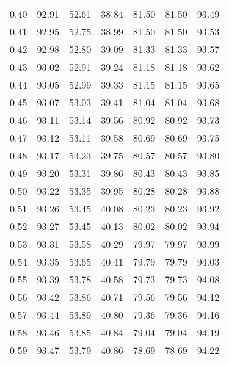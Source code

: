 \begin{tabular}{|c|c|c|c|c|c|c|}
      0.40 &     92.91 &     52.61 &      38.84 &   81.50 &      81.50 &         93.49 \\
      0.41 &     92.95 &     52.75 &      38.99 &   81.50 &      81.50 &         93.53 \\
      0.42 &     92.98 &     52.80 &      39.09 &   81.33 &      81.33 &         93.57 \\
      0.43 &     93.02 &     52.91 &      39.24 &   81.18 &      81.18 &         93.62 \\
      0.44 &     93.05 &     52.99 &      39.33 &   81.15 &      81.15 &         93.65 \\
      0.45 &     93.07 &     53.03 &      39.41 &   81.04 &      81.04 &         93.68 \\
      0.46 &     93.11 &     53.14 &      39.56 &   80.92 &      80.92 &         93.73 \\
      0.47 &     93.12 &     53.11 &      39.58 &   80.69 &      80.69 &         93.75 \\
      0.48 &     93.17 &     53.23 &      39.75 &   80.57 &      80.57 &         93.80 \\
      0.49 &     93.20 &     53.31 &      39.86 &   80.43 &      80.43 &         93.85 \\
      0.50 &     93.22 &     53.35 &      39.95 &   80.28 &      80.28 &         93.88 \\
      0.51 &     93.26 &     53.45 &      40.08 &   80.23 &      80.23 &         93.92 \\
      0.52 &     93.27 &     53.45 &      40.13 &   80.02 &      80.02 &         93.94 \\
      0.53 &     93.31 &     53.58 &      40.29 &   79.97 &      79.97 &         93.99 \\
      0.54 &     93.35 &     53.65 &      40.41 &   79.79 &      79.79 &         94.03 \\
      0.55 &     93.39 &     53.78 &      40.58 &   79.73 &      79.73 &         94.08 \\
      0.56 &     93.42 &     53.86 &      40.71 &   79.56 &      79.56 &         94.12 \\
      0.57 &     93.44 &     53.89 &      40.80 &   79.36 &      79.36 &         94.16 \\
      0.58 &     93.46 &     53.85 &      40.84 &   79.04 &      79.04 &         94.19 \\
      0.59 &     93.47 &     53.79 &      40.86 &   78.69 &      78.69 &         94.22 \\

\end{tabular}
